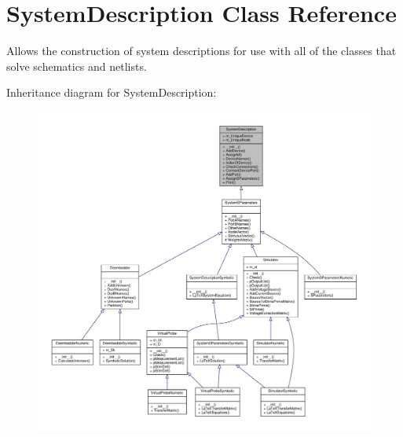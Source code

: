 \hypertarget{classSignalIntegrity_1_1SystemDescriptions_1_1SystemDescription_1_1SystemDescription}{}\section{System\+Description Class Reference}
\label{classSignalIntegrity_1_1SystemDescriptions_1_1SystemDescription_1_1SystemDescription}


Allows the construction of system descriptions for use with all of the classes that solve schematics and netlists.  




Inheritance diagram for System\+Description\+:
\nopagebreak
\begin{figure}[H]
\begin{center}
\leavevmode
\includegraphics[width=350pt]{classSignalIntegrity_1_1SystemDescriptions_1_1SystemDescription_1_1SystemDescription__inherit__graph}
\end{center}
\end{figure}


